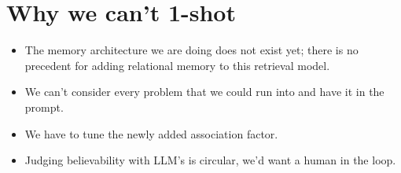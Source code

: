 \documentclass{article}
\begin{document}
\section{Why we can’t 1-shot}
\begin{itemize}
    \item The memory architecture we are doing does not exist yet; there is no precedent for adding relational memory to this retrieval model.
    \item We can’t consider every problem that we could run into and have it in the prompt.
    \item We have to tune the newly added association factor.
    \item Judging believability with LLM’s is circular, we’d want a human in the loop.
\end{itemize}


\printbibliography[title={Works Cited}]
 
\end{document}
